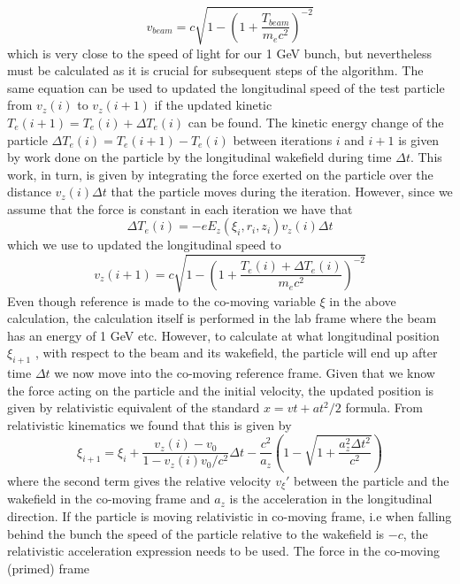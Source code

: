 \begin{equation}
v_{beam}=c \sqrt{1-\left({1+\frac{T_{beam}}{m_ec^2}}\right)^{-2}}
\end{equation}
which is very close to the speed of light for our 1 GeV bunch, but nevertheless must be calculated as it is crucial for subsequent steps of the algorithm.
The same equation can be used to updated the longitudinal speed of the test particle from $v_z(i)$ to $v_z(i+1)$ if the updated kinetic $T_e(i+1)=T_e(i)+\Delta T_e(i)$ can be found. The kinetic energy change of the particle $\Delta T_e(i)=T_e(i+1)-T_e(i)$ between iterations $i$ and $i+1$ is given by work done on the particle by the longitudinal wakefield during time $\Delta t$. This work, in turn, is given by integrating the force exerted on the particle over the distance $v_z(i)\Delta t$ that the particle moves during the iteration. However, since we assume that the force is constant in each iteration we have that
\begin{equation}
\Delta T_e(i)=-eE_z\left(\xi_i,r_i,z_i\right) v_z(i)\Delta t
\end{equation} 
which we use to updated the longitudinal speed to
\begin{equation}
v_z(i+1)=c \sqrt{1-\left({1+\frac{T_e(i)+\Delta T_e(i)}{m_ec^2}}\right)^{-2}}
\end{equation}
Even though reference is made to the co-moving variable $\xi$ in the above calculation, the calculation itself is performed in the lab frame where the beam has an energy of 1 GeV etc. However, to calculate at what longitudinal position $\xi_{i+1}$ , with respect to the beam and its wakefield, the particle will end up after time $\Delta t$ we now move into the co-moving reference frame. Given that we know the force acting on the particle and the initial velocity, the updated position is given by relativistic equivalent of the standard $x=vt+at^2/2$ formula. From relativistic kinematics we found that this is given by
\begin{equation}
\label{XiUpdate}
 \xi_{i+1}=\xi_i + \frac{v_z(i)-v_0}{1-v_z(i)v_0/c^2}\Delta t -\frac{c^2 }{a_z}\left(1-\sqrt{1+\frac{a_z^2 \Delta t^2}{c^2}}\right)
 \end{equation} 
 where the second term gives the relative velocity $v_{\xi}'$ between the particle and the wakefield in the co-moving frame and $a_z$ is the acceleration in the longitudinal direction. If the particle is moving relativistic in co-moving frame, i.e when falling behind the bunch the speed of the particle relative to the wakefield is $-c$, the relativistic acceleration expression needs to be used. The force in the co-moving (primed) frame
